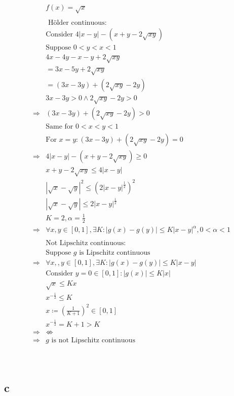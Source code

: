 \documentclass{article}
\begin{document}
\begin{align*}
    &f(x)=\sqrt{x}\\
    &\\
    &\text{ H\"older continuous}:\\
    &\text{Consider }4|x-y|-(x+y-2\sqrt{xy})\\
    &\text{Suppose }0<y<x<1\\
    &4x-4y-x-y+2\sqrt{xy}\\
    &=3x-5y+2\sqrt{xy}\\
    &=(3x-3y)+(2\sqrt{xy}-2y)\\
    &3x-3y>0\land2\sqrt{xy}-2y>0\\
    \Rightarrow&(3x-3y)+(2\sqrt{xy}-2y)>0\\
    &\text{Same for }0<x<y<1\\
    &\text{For }x=y:(3x-3y)+(2\sqrt{xy}-2y)=0\\
    \Rightarrow&4|x-y|-(x+y-2\sqrt{xy})\geqslant0\\
    &x+y-2\sqrt{xy}\leqslant4|x-y|\\
    &|\sqrt{x}-\sqrt{y}|^2\leqslant(2|x-y|^\frac{1}{2})^2\\
    &|\sqrt{x}-\sqrt{y}|\leqslant2|x-y|^\frac{1}{2}\\
    &K=2,\alpha=\frac{1}{2}\\
    \Rightarrow&\forall x,y\in [0,1],\exists K:|g(x)-g(y)|\leqslant K|x-y|^\alpha,0<\alpha<1\\
    &\\
    &\text{Not Lipschitz continuous}:\\
    &\text{Suppose }g\text{ is Lipschitz continuous}\\
    \Rightarrow&\forall x,,y\in [0,1],\exists K:|g(x)-g(y)|\leqslant K|x-y|\\
    &\text{Consider }y=0\in[0,1]:|g(x)|\leqslant K|x|\\
    &\sqrt{x}\leqslant Kx\\
    &x^{-\frac{1}{2}}\leqslant K\\
    &x\coloneqq (\frac{1}{K+1})^2\in[0,1]\\
    &x^{-\frac{1}{2}}=K+1>K\\
    \Rightarrow&\nLeftrightarrow\\
    \Rightarrow&g\text{ is not Lipschitz continuous}\\
\end{align*}

~

\subsection*{c}
\end{document}
